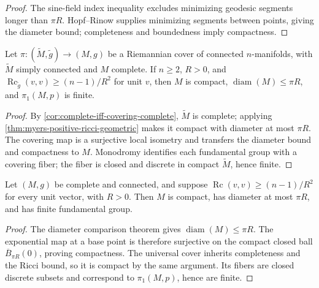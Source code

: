 \begin{proof}
\leanok
\sketch
The sine-field index inequality excludes minimizing geodesic segments longer
than $\pi R$.  Hopf--Rinow supplies minimizing segments between points, giving
the diameter bound; completeness and boundedness imply compactness.
\end{proof}

\begin{theorem}
\label{thm:myers-explicit-simply-connected-cover}
\leanok
{}
Let $\pi:(\widetilde M,\widetilde g)\to(M,g)$ be a Riemannian cover of
connected $n$-manifolds, with $\widetilde M$ simply connected and $M$ complete.
If $n\geq2$, $R>0$, and
$\operatorname{Rc}_{\widetilde g}(v,v)\geq(n-1)/R^2$ for unit $v$, then $M$ is
compact, $\operatorname{diam}(M)\leq\pi R$, and $\pi_1(M,p)$ is finite.
\end{theorem}

\begin{proof}
\leanok
\sketch
By \cref{cor:complete-iff-covering-complete}, $\widetilde M$ is complete;
applying \cref{thm:myers-positive-ricci-geometric} makes it compact with
diameter at most $\pi R$.  The covering map is a
surjective local isometry and transfers the diameter bound and compactness to
$M$.  Monodromy identifies each fundamental group with a covering fiber; the
fiber is closed and discrete in compact $\widetilde M$, hence finite.
\end{proof}

\begin{theorem}[Myers]
\label{thm:myers-positive-ricci}
\notready
{}
Let $(M,g)$ be complete and connected, and suppose
$\operatorname{Rc}(v,v)\geq(n-1)/R^2$ for every unit vector, with $R>0$.  Then
$M$ is compact, has diameter at most $\pi R$, and has finite fundamental group.
\end{theorem}

\begin{proof}
\sketch
The diameter comparison theorem gives $\operatorname{diam}(M)\leq\pi R$.
The exponential map at a base point is therefore surjective on the compact
closed ball $\overline B_{\pi R}(0)$, proving compactness.  The universal cover
inherits completeness and the Ricci bound, so it is compact by the same
argument.  Its fibers are closed discrete subsets and correspond to
$\pi_1(M,p)$, hence are finite.
\end{proof}

